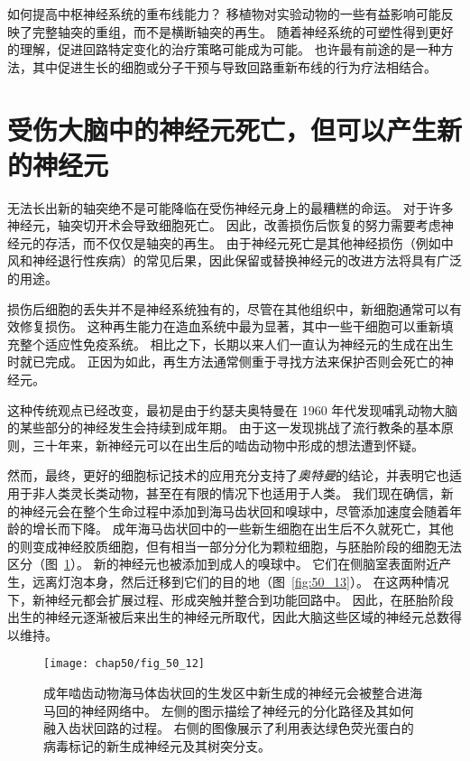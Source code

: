 如何提高中枢神经系统的重布线能力？
移植物对实验动物的一些有益影响可能反映了完整轴突的重组，而不是横断轴突的再生。
随着神经系统的可塑性得到更好的理解，促进回路特定变化的治疗策略可能成为可能。
也许最有前途的是一种方法，其中促进生长的细胞或分子干预与导致回路重新布线的行为疗法相结合。



\section{受伤大脑中的神经元死亡，但可以产生新的神经元}

无法长出新的轴突绝不是可能降临在受伤神经元身上的最糟糕的命运。
对于许多神经元，轴突切开术会导致细胞死亡。
因此，改善损伤后恢复的努力需要考虑神经元的存活，而不仅仅是轴突的再生。
由于神经元死亡是其他神经损伤（例如中风和神经退行性疾病）的常见后果，因此保留或替换神经元的改进方法将具有广泛的用途。


损伤后细胞的丢失并不是神经系统独有的，尽管在其他组织中，新细胞通常可以有效修复损伤。
这种再生能力在造血系统中最为显著，其中一些干细胞可以重新填充整个适应性免疫系统。
相比之下，长期以来人们一直认为神经元的生成在出生时就已完成。
正因为如此，再生方法通常侧重于寻找方法来保护否则会死亡的神经元。


这种传统观点已经改变，最初是由于约瑟夫奥特曼在 1960 年代发现哺乳动物大脑的某些部分的神经发生会持续到成年期。
由于这一发现挑战了流行教条的基本原则，三十年来，新神经元可以在出生后的啮齿动物中形成的想法遭到怀疑。


然而，最终，更好的细胞标记技术的应用充分支持了\textit{奥特曼}的结论，并表明它也适用于非人类灵长类动物，甚至在有限的情况下也适用于人类。
我们现在确信，新的神经元会在整个生命过程中添加到海马齿状回和嗅球中，尽管添加速度会随着年龄的增长而下降。
成年海马齿状回中的一些新生细胞在出生后不久就死亡，其他的则变成神经胶质细胞，但有相当一部分分化为颗粒细胞，与胚胎阶段的细胞无法区分（图~\ref{fig:50_12}）。
新的神经元也被添加到成人的嗅球中。
它们在侧脑室表面附近产生，远离灯泡本身，然后迁移到它们的目的地（图~\ref{fig:50_13}）。
在这两种情况下，新神经元都会扩展过程、形成突触并整合到功能回路中。
因此，在胚胎阶段出生的神经元逐渐被后来出生的神经元所取代，因此大脑这些区域的神经元总数得以维持。



\begin{figure}[htbp]
	\centering
	\texttt{[image: chap50/fig\_50\_12]}
	\caption{成年啮齿动物海马体齿状回的生发区中新生成的神经元会被整合进海马回的神经网络中。
		左侧的图示描绘了神经元的分化路径及其如何融入齿状回路的过程。
		右侧的图像展示了利用表达绿色荧光蛋白的病毒标记的新生成神经元及其树突分支。}
	\label{fig:50_12}
\end{figure}


